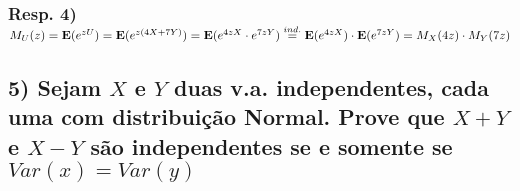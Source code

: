 \documentclass[portuguese]{article}
\begin{document}
\subsubsection*{\textmd{Resp. 4) }$M_{U}(z)=\mathbf{E}(e^{zU})=\mathbf{E}(e^{z(4X+7Y)})=\mathbf{E}(e^{4zX}\cdot e^{7zY})\protect\overset{ind.}{=}\mathbf{E}(e^{4zX})\cdot\mathbf{E}(e^{7zY})=M_{X}(4z)\cdot M_{Y}(7z)$}


\subsection*{\textcompwordmark{}}


\subsection*{\textmd{5) Sejam $X$ e $Y$ duas v.a. independentes, cada uma com
distribuição Normal. Prove que $X+Y$ e $X-Y$ são independentes se
e somente se $Var(x)=Var(y)$}}
\end{document}
